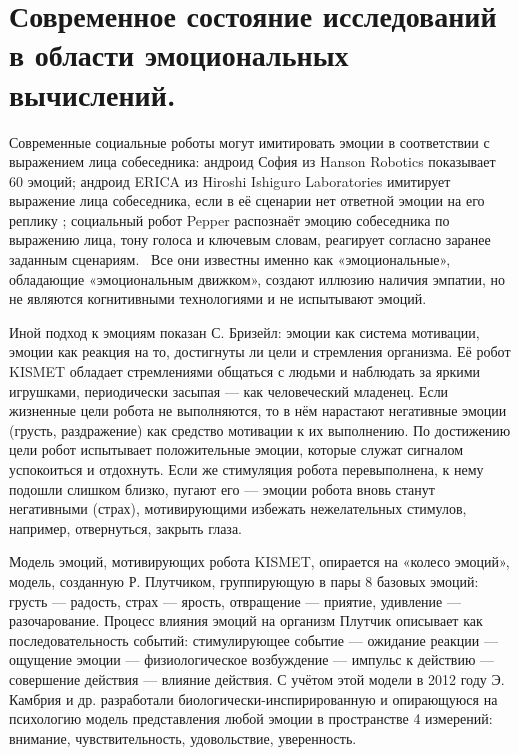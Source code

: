 \chapter{Современное состояние исследований в области эмоциональных вычислений.}
\label{chap:literature_review}
Современные социальные роботы могут имитировать эмоции в соответствии с выражением лица собеседника: андроид София из Hanson Robotics показывает 60 эмоций; андроид ERICA из Hiroshi Ishiguro Laboratories имитирует выражение лица собеседника, если в её сценарии нет ответной эмоции на его реплику \cite{erica}; социальный робот Pepper распознаёт эмоцию собеседника по выражению лица, тону голоса и ключевым словам, реагирует согласно заранее заданным сценариям.~\cite{meetpepper} Все они известны именно как «эмоциональные», обладающие «эмоциональным движком», создают иллюзию наличия эмпатии, но не являются когнитивными технологиями и не испытывают эмоций.


Иной подход к эмоциям показан С. Бризейл: эмоции как система мотивации, эмоции как реакция на то, достигнуты ли цели и стремления организма.\cite{Breazeal2003} Её робот KISMET обладает стремлениями общаться с людьми и наблюдать за яркими игрушками, периодически засыпая — как человеческий младенец. Если жизненные цели робота не выполняются, то в нём нарастают негативные эмоции (грусть, раздражение) как средство мотивации к их выполнению. По достижению цели робот испытывает положительные эмоции, которые служат сигналом успокоиться и отдохнуть. Если же стимуляция робота перевыполнена, к нему подошли слишком близко, пугают его — эмоции робота вновь станут негативными (страх), мотивирующими избежать нежелательных стимулов, например, отвернуться, закрыть глаза.


Модель эмоций, мотивирующих робота KISMET, опирается на «колесо эмоций», модель, созданную Р. Плутчиком, группирующую в пары 8 базовых эмоций: грусть — радость, страх — ярость, отвращение — приятие, удивление — разочарование. Процесс влияния эмоций на организм Плутчик описывает как последовательность событий: стимулирующее событие — ожидание реакции — ощущение эмоции — физиологическое возбуждение — импульс к действию — совершение действия — влияние действия.\cite{plutchik2001} С учётом этой модели в 2012 году Э. Камбрия и др. разработали биологически-инспирированную и опирающуюся на психологию модель представления любой эмоции в пространстве 4 измерений: внимание, чувствительность, удовольствие, уверенность.\cite{hourglass}


